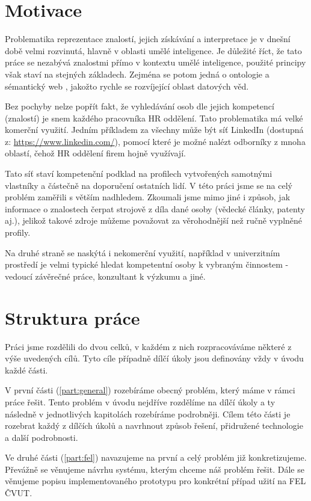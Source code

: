 \section{Motivace}
Problematika reprezentace znalostí, jejich získávání a interpretace je v dnešní době velmi rozvinutá, hlavně v oblasti umělé inteligence. Je důležité říct, že tato práce se nezabývá znalostmi přímo v kontextu umělé inteligence, použité principy však staví na stejných základech. Zejména se potom jedná o ontologie a sémantický web \cite{Stephan2007}, jakožto rychle se rozvíjející oblast datových věd.\par
Bez pochyby nelze popřít fakt, že vyhledávání osob dle jejich kompetencí (znalostí) je snem každého pracovníka HR oddělení. Tato problematika má velké komerční využití. Jedním příkladem za všechny může být síť LinkedIn (dostupná z: \url{https://www.linkedin.com/}), pomocí které je možné nalézt odborníky z mnoha oblastí, čehož HR oddělení firem hojně využívají.\par
Tato síť staví kompetenční podklad na profilech vytvořených samotnými vlastníky a částečně na doporučení ostatních lidí. V této práci jsme se na celý problém zaměřili s větším nadhledem. Zkoumali jsme mimo jiné i způsob, jak informace o znalostech čerpat strojově z díla dané osoby (vědecké články, patenty aj.), jelikož takové zdroje můžeme považovat za věrohodnější než ručně vyplněné profily.\par
Na druhé straně se naskýtá i nekomerční využití, například v univerzitním prostředí je velmi typické hledat kompetentní osoby k vybraným činnostem - vedoucí závěrečné práce, konzultant k výzkumu a jiné.

\section{Struktura práce} 
Práci jsme rozdělili do dvou celků, v každém z nich rozpracováváme některé z výše uvedených cílů. Tyto cíle případně dílčí úkoly jsou definovány vždy v úvodu každé části.\par
V první části (\ref{part:general}) rozebíráme obecný problém, který máme v rámci práce řešit. Tento problém v úvodu nejdříve rozdělíme na dílčí úkoly a ty následně v jednotlivých kapitolách rozebíráme podrobněji. Cílem této části je rozebrat každý z dílčích úkolů a navrhnout způsob řešení, přidružené technologie a další podrobnosti.\par
Ve druhé části (\ref{part:fel}) navazujeme na první a celý problém již konkretizujeme. Převážně se věnujeme návrhu systému, kterým chceme náš problém řešit. Dále se věnujeme popisu implementovaného prototypu pro konkrétní případ užití na FEL ČVUT.

